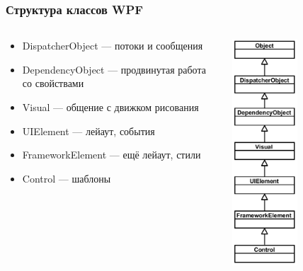 \documentclass[xetex,mathserif,serif]{beamer}
\begin{document}
	\begin{frame}[fragile]
		\frametitle{Структура классов WPF}
		\begin{columns}
			\begin{column}{0.7\textwidth}
				\begin{itemize}
					\item DispatcherObject --- потоки и сообщения
					\item DependencyObject --- продвинутая работа со свойствами
					\item Visual --- общение с движком рисования
					\item UIElement --- лейаут, события
					\item FrameworkElement --- ещё лейаут, стили
					\item Control --- шаблоны
				\end{itemize}
			\end{column}
			\begin{column}{0.3\textwidth}
				\begin{center}
					\includegraphics[width=0.5\textwidth]{wpfClassStructure.png}

\end{center}
\end{column}
\end{columns}
\end{frame}
\end{document}
